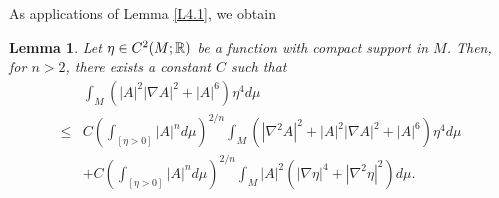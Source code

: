 \documentclass{amsart}
\newtheorem{lemma}[theorem]{Lemma}
\theoremstyle{definition}
\numberwithin{equation}{section}
\begin{document}
As applications of Lemma \ref{L4.1}, we obtain
\begin{lemma} \label{L4.2}  Let $\eta\in C^2(M; \Bbb R)$ be a function with compact support in $M$.
Then,  for $n> 2$, there exists a constant $C$ such that
\begin{align}\label{E1}
    &\int_{M}( |A|^{2}|\nabla A|^2+ |A|^{6} )\eta^4 d\mu\\
    \leq & C \left ( \int_{[\eta >0] } \left| A \right|^{n} d\mu \right)^{2/n}\int_{M} ( |\nabla^{2}  A|^2 +|A|^2 |\nabla A|^2+ |A|^{6})
    \eta^4 d\mu  \nonumber \\
    &+ C \left ( \int_{[\eta >0]}  \left| A \right|^{n} d\mu \right )^{2/n} \int_{M} |  A|^{2} ( |\nabla \eta|^4+|\nabla^2 \eta|^2)  d\mu.
    \nonumber
\end{align}

 \end{lemma}
\end{document}
